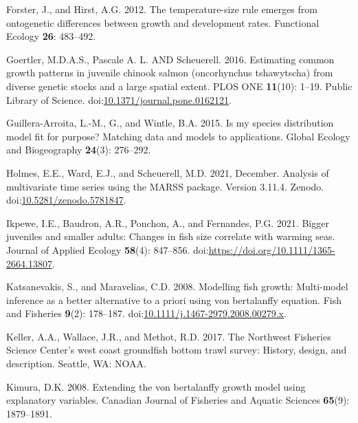 \documentclass[
]{article}
\newlength{\cslhangindent}
\newlength{\cslentryspacingunit} %
\newenvironment{CSLReferences}[2] %
 {%
  \setlength{\parindent}{0pt}
  \ifodd #1
  \let\oldpar\par
  \def\par{\hangindent=\cslhangindent\oldpar}
  \fi
  \setlength{\parskip}{#2\cslentryspacingunit}
 }%
 {}
\begin{document}
\begin{CSLReferences}{1}{0}
\leavevmode{}%
Forster, J., and Hirst, A.G. 2012. The temperature-size rule emerges
from ontogenetic differences between growth and development rates.
Functional Ecology \textbf{26}: 483--492.

\leavevmode{}%
Goertler, M.D.A.S., Pascale A. L. AND Scheuerell. 2016. Estimating
common growth patterns in juvenile chinook salmon (oncorhynchus
tshawytscha) from diverse genetic stocks and a large spatial extent.
PLOS ONE \textbf{11}(10): 1--19. Public Library of Science.
doi:\href{https://doi.org/10.1371/journal.pone.0162121}{10.1371/journal.pone.0162121}.

\leavevmode{}%
Guillera-Arroita, L.-M., G., and Wintle, B.A. 2015. Is my species
distribution model fit for purpose? Matching data and models to
applications. Global Ecology and Biogeography \textbf{24}(3): 276--292.

\leavevmode{}%
Holmes, E.E., Ward, E.J., and Scheuerell, M.D. 2021, December. {Analysis
of multivariate time series using the MARSS package. Version 3.11.4}.
Zenodo.
doi:\href{https://doi.org/10.5281/zenodo.5781847}{10.5281/zenodo.5781847}.

\leavevmode{}%
Ikpewe, I.E., Baudron, A.R., Ponchon, A., and Fernandes, P.G. 2021.
Bigger juveniles and smaller adults: Changes in fish size correlate with
warming seas. Journal of Applied Ecology \textbf{58}(4): 847--856.
doi:\url{https://doi.org/10.1111/1365-2664.13807}.

\leavevmode{}%
Katsanevakis, S., and Maravelias, C.D. 2008. Modelling fish growth:
Multi-model inference as a better alternative to a priori using von
bertalanffy equation. Fish and Fisheries \textbf{9}(2): 178--187.
doi:\href{https://doi.org/10.1111/j.1467-2979.2008.00279.x}{10.1111/j.1467-2979.2008.00279.x}.

\leavevmode{}%
Keller, A.A., Wallace, J.R., and Methot, R.D. 2017. The {Northwest
Fisheries Science Center's} west coast groundfish bottom trawl survey:
History, design, and description. Seattle, WA: NOAA.

\leavevmode{}%
Kimura, D.K. 2008. Extending the von bertalanffy growth model using
explanatory variables. Canadian Journal of Fisheries and Aquatic
Sciences \textbf{65}(9): 1879--1891.


\end{CSLReferences}
\end{document}
